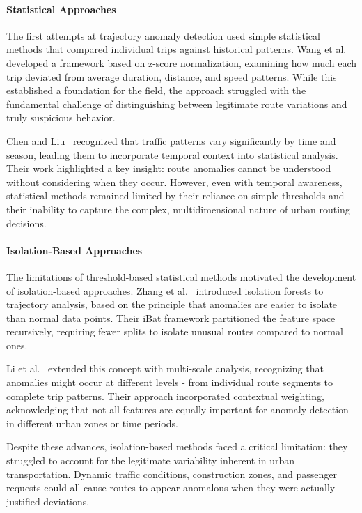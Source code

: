 \documentclass[runningheads]{llncs}
\begin{document}
\paragraph{Statistical Approaches}
The first attempts at trajectory anomaly detection used simple statistical methods that compared individual trips against historical patterns. Wang et al.~\cite{wang2020statistical} developed a framework based on z-score normalization, examining how much each trip deviated from average duration, distance, and speed patterns. While this established a foundation for the field, the approach struggled with the fundamental challenge of distinguishing between legitimate route variations and truly suspicious behavior.

Chen and Liu~\cite{chen2021temporal} recognized that traffic patterns vary significantly by time and season, leading them to incorporate temporal context into statistical analysis. Their work highlighted a key insight: route anomalies cannot be understood without considering when they occur. However, even with temporal awareness, statistical methods remained limited by their reliance on simple thresholds and their inability to capture the complex, multidimensional nature of urban routing decisions.

\paragraph{Isolation-Based Approaches}
The limitations of threshold-based statistical methods motivated the development of isolation-based approaches. Zhang et al.~\cite{zhang2019ibat} introduced isolation forests to trajectory analysis, based on the principle that anomalies are easier to isolate than normal data points. Their iBat framework partitioned the feature space recursively, requiring fewer splits to isolate unusual routes compared to normal ones.

Li et al.~\cite{li2022enhanced} extended this concept with multi-scale analysis, recognizing that anomalies might occur at different levels - from individual route segments to complete trip patterns. Their approach incorporated contextual weighting, acknowledging that not all features are equally important for anomaly detection in different urban zones or time periods.

Despite these advances, isolation-based methods faced a critical limitation: they struggled to account for the legitimate variability inherent in urban transportation. Dynamic traffic conditions, construction zones, and passenger requests could all cause routes to appear anomalous when they were actually justified deviations.
\end{document}
